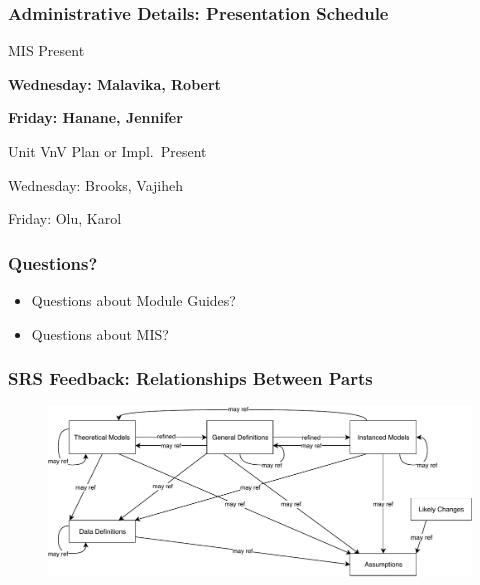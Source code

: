 \documentclass[t,12pt,numbers,fleqn]{beamer}
\begin{document}

\begin{frame}
\frametitle{Administrative Details: Presentation Schedule}

\bi
\item MIS Present
\bi
\item \textbf{Wednesday: Malavika, Robert}
\item \textbf{Friday: Hanane,  Jennifer}
\ei
\item Unit VnV Plan or Impl.\ Present
\bi
\item Wednesday: Brooks, Vajiheh
\item Friday: Olu, Karol
\ei
\ei

\end{frame}


\begin{frame}
\frametitle{Questions?}
\begin{itemize}
\item Questions about Module Guides?
\item Questions about MIS?
\end{itemize}
\end{frame}


\begin{frame}
  
\frametitle{SRS Feedback: Relationships Between Parts}

\begin{figure}[H]
  \includegraphics[scale=0.59]{../Figures/RelationsBetweenTM_GD_IM_DD_A.pdf}
\end{figure}

\end{frame}

\end{document}
